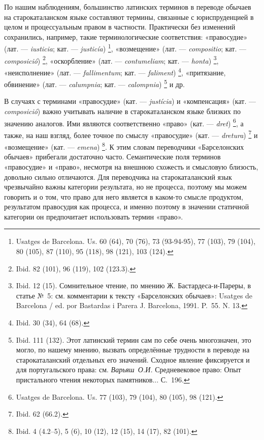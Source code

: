 По нашим наблюдениям, большинство латинских терминов в переводе обычаев на старокаталанском языке составляют термины, связанные с юриспруденцией в целом и процессуальным правом в частности. Практически без изменений сохранились, например, такие терминологические соответствия: «правосудие» (лат. --- \emph{iusticia}; кат. --- \emph{justicía})\emph{\textsuperscript{ }}\footnote{Usatges de Barcelona. Us. 60 (64), 70 (76), 73 (93-94-95), 77 (103), 79 (104), 80 (105), 87 (110), 95 (118), 98 (121), 103 (124).}, «возмещение» (лат. --- \emph{compositio}; кат. --- \emph{composició})\emph{\textsuperscript{ }}\footnote{Ibid. 82 (101), 96 (119), 102 (123.3).}, «оскорбление» (лат. --- \emph{contumeliam}; кат. --- \emph{honta})\emph{\textsuperscript{ }}\footnote{Ibid. 12 (15). Сомнительное чтение, по мнению Ж. Бастардеса-и-Пареры, в статье №~5: см. комментарии к тексту «Барселонских обычаев»: Usatges de Barcelona / ed. por Bastardas i Parera J. Barcelona, 1991. P.~55. N. 13.}, «неисполнение» (лат. --- \emph{fallimentum}; кат. --- \emph{faliment})\emph{\textsuperscript{ }}\footnote{Ibid. 30 (34), 64 (68).}, «притязание, обвинение» (лат. --- \emph{calumpnia}; кат. --- \emph{calompnia})\textsuperscript{ }\footnote{Ibid. 111 (132). Этот латинский термин сам по себе очень многозначен, это могло, по нашему мнению, вызвать определённые трудности в переводе на старокаталанский отдельных его значений. Сходное явление фиксируется и для португальского права: см. \emph{Варьяш~О.И. }Средневековое право: Опыт пристального чтения некоторых памятников... С.~196.} и др.

В случаях с терминами «правосудие» (кат. --- \emph{justícia}) и «компенсация» (кат. --- \emph{composició}) важно учитывать наличие в старокаталанском языке близких по значению аналогов. Ими являются соответственно «право» (кат. --- \emph{dret})\textsuperscript{ }\footnote{Usatges de Barcelona. Us. 77 (103), 79 (104), 80 (105), 98 (121).}, а также, на наш взгляд, более точное по смыслу «правосудие» (кат. --- \emph{dretura})\textsuperscript{ }\footnote{Ibid. 62 (66.2).} и «возмещение» (кат. --- \emph{emena})\textsuperscript{ }\footnote{Ibid. 4 (4.2--5), 5 (6), 10 (12), 12 (15), 14 (17), 82 (101).}. К этим словам переводчики «Барселонских обычаев» прибегали достаточно часто. Семантические поля терминов «правосудие» и «право», несмотря на внешнюю схожесть и смысловую близость, довольно сильно отличаются. Для переводчика на старокаталанский язык чрезвычайно важны категории результата, но не процесса, поэтому мы можем говорить и о том, что право для него является в каком-то смысле продуктом, результатом правосудия как процесса, и именно поэтому в значении статичной категории он предпочитает использовать термин «право».

